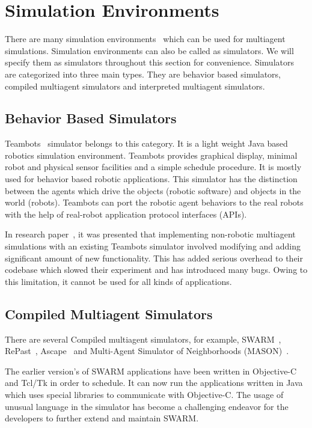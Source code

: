\section{Simulation Environments}
\label{section.Sim}

There are many simulation environments~\cite{rob} which can be used for multiagent simulations. Simulation environments can also be called as simulators. We will specify them as simulators throughout this section for convenience. Simulators are categorized into three main types. They are behavior based simulators, compiled multiagent simulators and interpreted multiagent simulators. 

\subsection{Behavior Based Simulators}

Teambots~\cite{Balch2000} simulator belongs to this category. It is a light weight Java based robotics simulation environment. Teambots provides graphical display, minimal robot and physical sensor facilities and a simple schedule procedure. It is mostly used for behavior based robotic applications. This simulator has the distinction between the agents which drive the objects (robotic software) and objects in the world (robots). Teambots can port the robotic agent behaviors to the real robots with the help of real-robot application protocol interfaces (APIs).

In research paper~\cite{MASON2005}, it was presented that implementing non-robotic multiagent simulations with an existing Teambots simulator involved modifying and adding significant amount of new functionality. This has added serious overhead to their codebase which slowed their experiment and has introduced many bugs. Owing to this limitation, it cannot be used for all kinds of applications.


\subsection{Compiled Multiagent Simulators}

There are several Compiled multiagent simulators, for example, SWARM~\cite{Paul2000}, RePast~\cite{Repast2001, Repast}, Ascape~\cite{Miles2001, Ascape} and  Multi-Agent Simulator of Neighborhoods (MASON)~\cite{MASON, MASON2005, MASONMANUAL2011}. 

The earlier version's of SWARM applications have been written in Objective-C and Tcl/Tk in order to schedule. It can now run the applications written in Java which uses special libraries to communicate with Objective-C. The usage of unusual language in the simulator has become a challenging endeavor for the developers to further extend and maintain SWARM.

